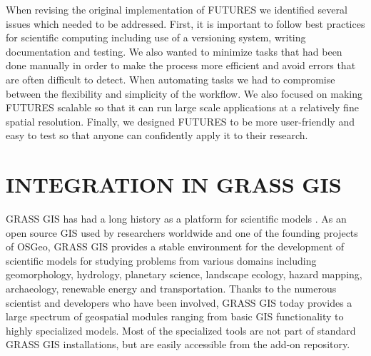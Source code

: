 \documentclass{isprs}
\begin{document}
When revising the original implementation of FUTURES we identified
several issues which needed to be addressed. 
First, it is important to follow best practices for scientific computing \cite{wilson2014best}
including use of a versioning system, writing documentation and testing.
We also wanted to minimize tasks that had been done manually in order to make the process more efficient and avoid errors 
that are often difficult to detect.
When automating tasks 
we had to compromise between 
the flexibility and simplicity %
of the workflow.
%
We also focused on making FUTURES scalable 
so that it can run
large scale applications
at a relatively fine spatial resolution.
Finally, we designed FUTURES to be more user-friendly and easy to test so that
anyone can confidently apply it to their research.


\section{INTEGRATION IN GRASS GIS}
GRASS GIS has had a long history as a platform for scientific models \cite{chemin2015grass}.
As an open source GIS used by researchers worldwide and one of the founding projects of OSGeo,
GRASS GIS provides a stable environment for the development of
scientific models 
for studying problems from various domains
including geomorphology, hydrology, planetary science, landscape ecology, hazard mapping, archaeology, renewable energy and transportation.
Thanks to the numerous scientist and developers who have been involved, GRASS GIS today provides a large spectrum of geospatial modules
ranging from basic GIS functionality to highly specialized models.
Most of the specialized tools are not part of standard GRASS GIS installations,
but are easily accessible from the add-on repository.
\end{document}
